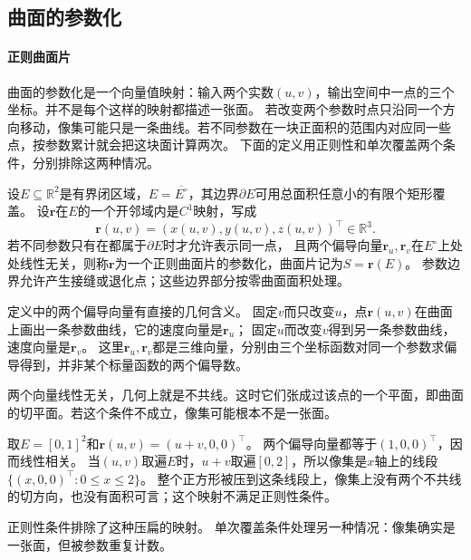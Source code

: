 \subsection{曲面的参数化}

\paragraph{正则曲面片}

曲面的参数化是一个向量值映射：输入两个实数$(u,v)$，输出空间中一点的三个坐标。并不是每个这样的映射都描述一张面。
若改变两个参数时点只沿同一个方向移动，像集可能只是一条曲线。若不同参数在一块正面积的范围内对应同一些点，按参数累计就会把这块面计算两次。
下面的定义用正则性和单次覆盖两个条件，分别排除这两种情况。

\begin{definition}[正则参数曲面片]
\label{def:analysis-regular-surface-patch}
设$E\subseteq\mathbb R^2$是有界闭区域，$E=\overline{E^\circ}$，其边界$\partial E$可用总面积任意小的有限个矩形覆盖。
设$\bm r$在$E$的一个开邻域内是$C^1$映射，写成
\[
 \bm r(u,v)=(x(u,v),y(u,v),z(u,v))^\top\in\mathbb R^3.
\]
若不同参数只有在都属于$\partial E$时才允许表示同一点，
且两个偏导向量$\bm r_u,\bm r_v$在$E^\circ$上处处线性无关，则称$\bm r$为一个正则曲面片的参数化，曲面片记为$S=\bm r(E)$。
参数边界允许产生接缝或退化点；这些边界部分按零曲面面积处理。
\end{definition}

定义中的两个偏导向量有直接的几何含义。
固定$v$而只改变$u$，点$\bm r(u,v)$在曲面上画出一条参数曲线，它的速度向量是$\bm r_u$；
固定$u$而改变$v$得到另一条参数曲线，速度向量是$\bm r_v$。
这里$\bm r_u,\bm r_v$都是三维向量，分别由三个坐标函数对同一个参数求偏导得到，并非某个标量函数的两个偏导数。

两个向量线性无关，几何上就是不共线。这时它们张成过该点的一个平面，即曲面的切平面。若这个条件不成立，像集可能根本不是一张面。

\begin{example}[像集退化为线段的参数映射]
取$E=[0,1]^2$和$\bm r(u,v)=(u+v,0,0)^\top$。
两个偏导向量都等于$(1,0,0)^\top$，因而线性相关。
当$(u,v)$取遍$E$时，$u+v$取遍$[0,2]$，所以像集是$x$轴上的线段$\{(x,0,0)^\top:0\leq x\leq2\}$。
整个正方形被压到这条线段上，像集上没有两个不共线的切方向，也没有面积可言；这个映射不满足正则性条件。
\end{example}

正则性条件排除了这种压扁的映射。
单次覆盖条件处理另一种情况：像集确实是一张面，但被参数重复计数。

